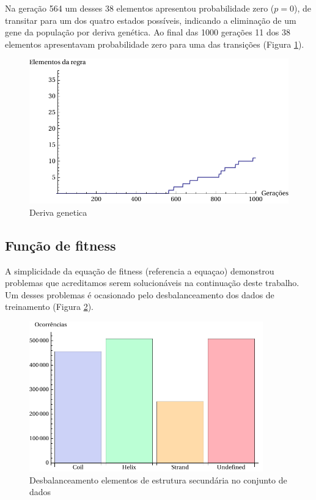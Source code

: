 Na geração 564 um desses 38 elementos apresentou probabilidade zero ($p=0$), de transitar para um dos quatro estados possíveis, indicando a eliminação de um gene da população por deriva genética. Ao final das 1000 gerações 11 dos 38 elementos apresentavam probabilidade zero para uma das transições (Figura \ref{fig:deriva_genetica}).

\begin{figure}
  \centering
  \includegraphics[width=1\textwidth]{figures/deriva_genetica.pdf}
  \caption{Deriva genetica}
        \label{fig:deriva_genetica}
\end{figure}

\subsection{Função de fitness}

A simplicidade da equação de fitness (referencia a equaçao) demonstrou problemas que acreditamos serem solucionáveis na continuação deste trabalho. Um desses problemas é ocasionado pelo desbalanceamento dos dados de treinamento (Figura \ref{fig:occ_ss}). 

\begin{figure}
  \centering
  \includegraphics[width=0.9\textwidth]{figures/occ_ss.pdf}
  \caption{Desbalanceamento elementos de estrutura secundária no conjunto de dados}
        \label{fig:occ_ss}
\end{figure}

